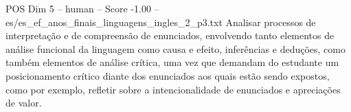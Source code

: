 \begin{textsample}{POS Dim 5 – human – Score -1.00 – es/es\_ef\_anos\_finais\_linguagens\_ingles\_2\_p3.txt}  \label{ex:f5_pos_010}
Analisar processos de interpretação e de compreensão de enunciados, envolvendo tanto elementos de análise funcional da linguagem como causa e efeito, inferências e deduções, como também elementos de análise crítica, uma vez que demandam do estudante um posicionamento crítico diante dos enunciados aos quais estão sendo expostos, como por exemplo, refletir sobre a intencionalidade de enunciados e apreciações de valor.

\end{textsample}
